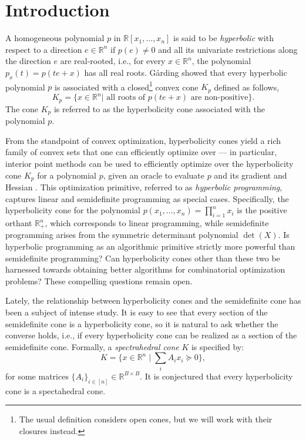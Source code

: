 \newcommand{\R}{\mathbb{R}}
\newcommand{\hdist}{\mathsf{hdist}}
\newcommand{\mdist}{\mathsf{mdist}}
\section{Introduction}

A homogeneous polynomial $p$ in $\R[x_1,\ldots,x_n]$ is said to be {\em hyperbolic} with respect to a direction $e \in \R^n$ if $p(e)\neq 0$ and all its univariate restrictions along the direction $e$ are real-rooted, i.e., for every $x \in \R^n$, the polynomial $p_x(t) = p(t e + x)$ has all real roots.
%
G\aa rding showed that every hyperbolic polynomial $p$ is associated with a closed\footnote{The usual definition considers open cones, but we will work with their closures instead.} convex cone $K_p$ defined as follows,
\[ K_p = \{x \in \R^n | \text{ all roots of } p(te + x) \text{ are non-positive} \}. \]
%
The cone $K_p$ is referred to as the hyperbolicity cone associated with the polynomial $p$.  

From the standpoint of convex optimization, hyperbolicity cones yield a rich
family of convex sets that one can efficiently optimize over --- in particular,
interior point methods can be used to efficiently optimize over the
hyperbolicity cone $K_p$ for a polynomial $p$, given an oracle to evaluate $p$
and its gradient and Hessian \cite{guler1997,renegar2006hyperbolic}. This
optimization primitive,  referred to as {\it hyperbolic programming}, captures
linear and semidefinite programming as special cases.  Specifically, the
hyperbolicity cone for the polynomial $p(x_1,\ldots,x_n) = \prod_{i = 1}^n x_i$
is the positive orthant $\R_+^n$, which corresponds to linear programming, while
semidefinite programming arises from the symmetric determinant polynomial
$\det(X)$. 
Is hyperbolic programming as an algorithmic primitive strictly more
 powerful than semidefinite programming?
Can hyperbolicity cones other than these two be harnessed towards obtaining
 better algorithms for combinatorial optimization problems?  These compelling questions remain
 open.  

Lately, the relationship between hyperbolicity cones and the semidefinite cone has been a subject
of intense study. It is easy to see that every section of the semidefinite cone is a hyperbolicity cone, so it is natural to ask
whether the converse holds, i.e., if every
hyperbolicity cone can be realized as a section of the semidefinite cone.
Formally, a {\it spectrahedral cone} $K$ is specified by:
$$ K = \{ x \in \R^n \mid \sum_i A_i x_i \succeq 0 \},$$ for some matrices $\{A_i\}_{i \in [n]} \in
\R^{B \times B}$.  It is conjectured that every hyperbolicity cone is a
spectahedral cone.

